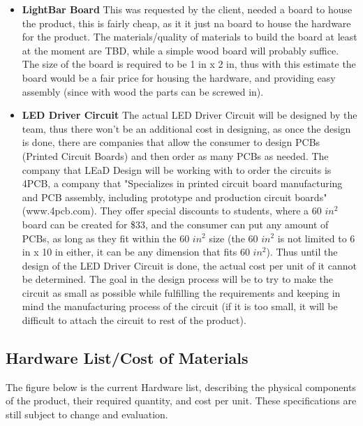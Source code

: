 \documentclass[12pt]{article}
\begin{document}
{{\begin{itemize}
				\item \textbf{LightBar Board}
				This was requested by the client, needed a board to house the product, this is fairly cheap, as it it just na board to house the hardware for the product. The materials/quality of materials to build the board at least at the moment are TBD, while a simple wood board will probably suffice. The size of the board is required to be 1 in x 2 in, thus with this estimate the board would be a fair price for housing the hardware, and providing easy assembly (since with wood the parts can be screwed in).	
				\item \textbf{LED Driver Circuit}
				The actual LED Driver Circuit will be designed by the team, thus there won't be an additional cost in designing, as once the design is done, there are companies that allow the consumer to design PCBs (Printed Circuit Boards) and then order as many PCBs as needed. The company that LEaD Design will be working with to order the circuits is 4PCB, a company that "Specializes in printed circuit board manufacturing and PCB assembly, including prototype and production circuit boards" (www.4pcb.com). They offer special discounts to students, where a 60 $in^2$ board can be created for \$33, and the consumer can put any amount of PCBs, as long as they fit within the 60 $in^2$ size (the 60 $in^2$ is not limited to 6 in x 10 in either, it can be any dimension that fits 60 $in^2$). Thus until the design of the LED Driver Circuit is done, the actual cost per unit of it cannot be determined. The goal in the design process will be to try to make the circuit as small as possible while fulfilling the requirements and keeping in mind the manufacturing process of the circuit (if it is too small, it will be difficult to attach the circuit to rest of the product).
			\end{itemize}
			
			\subsection{Hardware List/Cost of Materials}
			The figure below is the current Hardware list, describing the physical components of the product, their required quantity, and cost per unit. These specifications are still subject to change and evaluation.
			
}}
\end{document}
